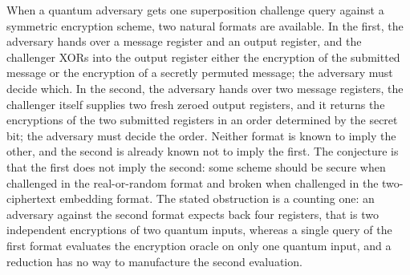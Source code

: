 \documentclass{conjura-conjecture}
\begin{document}

\vspace{0.4em}

\begin{informalconjecture}
When a quantum adversary gets one superposition challenge query against
a symmetric encryption scheme, two natural formats are available. In the
first, the adversary hands over a message register and an output
register, and the challenger XORs into the output register either the
encryption of the submitted message or the encryption of a secretly
permuted message; the adversary must decide which. In the second, the
adversary hands over two message registers, the challenger itself
supplies two fresh zeroed output registers, and it returns the
encryptions of the two submitted registers in an order determined by the
secret bit; the adversary must decide the order. Neither format is known
to imply the other, and the second is already known not to imply the
first. The conjecture is that the first does not imply the second: some
scheme should be secure when challenged in the real-or-random format and
broken when challenged in the two-ciphertext embedding format. The
stated obstruction is a counting one: an adversary against the second
format expects back four registers, that is two independent encryptions
of two quantum inputs, whereas a single query of the first format
evaluates the encryption oracle on only one quantum input, and a
reduction has no way to manufacture the second evaluation.
\end{informalconjecture}
\end{document}
